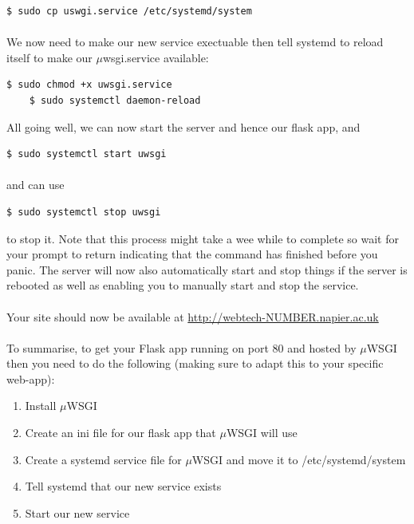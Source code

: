 \documentclass[12pt, a4paper, oneside]{book}
\begin{document}
{\begin{lstlisting}[style=DOS]
    $ sudo cp uswgi.service /etc/systemd/system
\end{lstlisting}

\paragraph{} We now need to make our new service exectuable then tell systemd to reload itself to make our $\mu$wsgi.service available:

\begin{lstlisting}[style=DOS]
    $ sudo chmod +x uwsgi.service
    $ sudo systemctl daemon-reload
\end{lstlisting}

All going well, we can now start the server and hence our flask app, and

\begin{lstlisting}[style=DOS]
    $ sudo systemctl start uwsgi
\end{lstlisting}

\paragraph{} and can use
\begin{lstlisting}[style=DOS]
    $ sudo systemctl stop uwsgi
\end{lstlisting}

to stop it. Note that this process might take a wee while to complete so wait for your prompt to return indicating that the command has finished before you panic. The server will now also automatically start and stop things if the server is rebooted as well as enabling you to manually start and stop the service.

\paragraph{} Your site should now be available at \url{http://webtech-NUMBER.napier.ac.uk}

\paragraph{} To summarise, to get your Flask app running on port 80 and hosted by $\mu$WSGI then you need to do the following (making sure to adapt this to your specific web-app):

\begin{enumerate}
\item Install $\mu$WSGI
\item Create an ini file for our flask app that $\mu$WSGI will use
\item Create a systemd service file for $\mu$WSGI and move it to /etc/systemd/system
\item Tell systemd that our new service exists
\item Start our new service
\end{enumerate}

}
\end{document}
